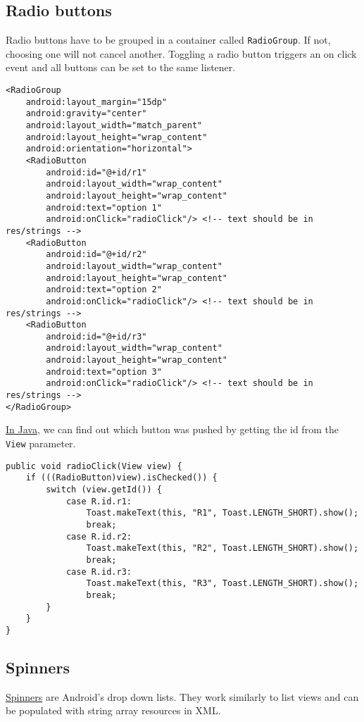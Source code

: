 \subsection{Radio buttons}
Radio buttons have to be grouped in a container called \texttt{RadioGroup}. If not, choosing one will not cancel another. Toggling a radio button triggers an on click event and all buttons can be set to the same listener.
\begin{lstlisting}[style=A_XML, caption={Radio button declaration}, label={listing:radiodecl}]
<RadioGroup
    android:layout_margin="15dp"
    android:gravity="center"
    android:layout_width="match_parent"
    android:layout_height="wrap_content"
    android:orientation="horizontal">
    <RadioButton
        android:id="@+id/r1"
        android:layout_width="wrap_content"
        android:layout_height="wrap_content"
        android:text="option 1"
        android:onClick="radioClick"/> <!-- text should be in res/strings -->
    <RadioButton
        android:id="@+id/r2"
        android:layout_width="wrap_content"
        android:layout_height="wrap_content"
        android:text="option 2"
        android:onClick="radioClick"/> <!-- text should be in res/strings -->
    <RadioButton
        android:id="@+id/r3"
        android:layout_width="wrap_content"
        android:layout_height="wrap_content"
        android:text="option 3"
        android:onClick="radioClick"/> <!-- text should be in res/strings -->
</RadioGroup>
\end{lstlisting}

\href{https://github.com/JonSteinn/AndroidDevelopment/tree/master/examples/lab1/radiobuttons}{In Java}, we can find out which button was pushed by getting the id from the \texttt{View} parameter. 

\begin{lstlisting}[style=A_Java, caption={Radio button event}, label={listing:radioev}]
public void radioClick(View view) {
    if (((RadioButton)view).isChecked()) {
        switch (view.getId()) {
            case R.id.r1:
                Toast.makeText(this, "R1", Toast.LENGTH_SHORT).show();
                break;
            case R.id.r2:
                Toast.makeText(this, "R2", Toast.LENGTH_SHORT).show();
                break;
            case R.id.r3:
                Toast.makeText(this, "R3", Toast.LENGTH_SHORT).show();
                break;
        }
    }
}
\end{lstlisting}

\subsection{Spinners}
\href{https://github.com/JonSteinn/AndroidDevelopment/tree/master/examples/lab1/spinner}{Spinners} are Android's drop down lists. They work similarly to list views and can be populated with string array resources in XML.

